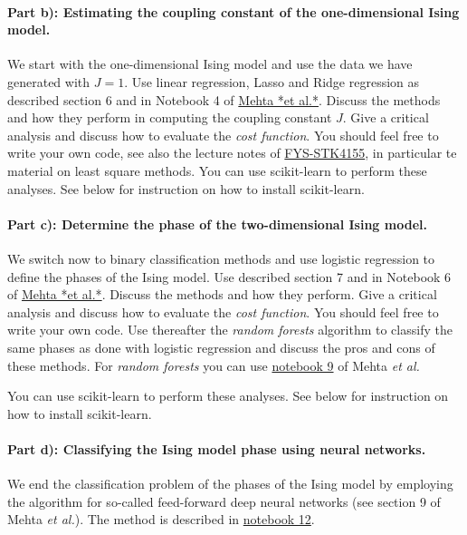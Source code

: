 \documentclass[%
oneside,                 %
final,                   %
10pt]{article}
\begin{document}
\paragraph{Part b): Estimating the coupling constant of the one-dimensional Ising model.}
We start with the one-dimensional Ising model and use the data we have generated with $J=1$. Use linear regression, Lasso and Ridge regression as described section 6 and in Notebook 4 of \href{{https://physics.bu.edu/~pankajm/ML-Notebooks/HTML/NB_CVI-linreg_ising.html}}{Mehta *et al.*}. Discuss the methods and how they perform in computing the coupling constant $J$. Give a critical analysis and discuss how to evaluate the \emph{cost function}. You should feel free to write your own code, see also
the lecture notes of \href{{https://compphysics.github.io/MachineLearning/doc/web/course.html}}{FYS-STK4155}, in particular te material on least square methods.  You can use scikit-learn to perform these analyses. See below for instruction on how to install scikit-learn.

\paragraph{Part c): Determine the phase of the two-dimensional Ising model.}
We switch now to binary classification methods and use logistic regression to define the phases of the Ising model.
Use described section 7 and in Notebook 6 of \href{{https://physics.bu.edu/~pankajm/ML-Notebooks/HTML/NB_CVII-logreg_ising.html}}{Mehta *et al.*}. Discuss the methods and how they perform. Give a critical analysis and discuss how to evaluate the \emph{cost function}. You should feel free to write your own code. Use thereafter the \emph{random forests} algorithm to classify the same phases as done with logistic regression and discuss the pros and cons of these methods. For \emph{random forests} you can use \href{{https://physics.bu.edu/~pankajm/ML-Notebooks/HTML/NB_CVIII-randomforests_ising.html}}{notebook 9} of Mehta \emph{et al.}

You can use scikit-learn to perform these analyses. See below for instruction on how to install scikit-learn.

\paragraph{Part d): Classifying the Ising model phase using neural networks.}
We end the classification problem of the phases of the Ising model by employing the algorithm for so-called feed-forward deep neural networks (see section 9 of Mehta \emph{et al.}). The method is described in \href{{https://physics.bu.edu/~pankajm/ML-Notebooks/HTML/NB_CIX-DNN_ising_TFlow.html}}{notebook 12}. 
\end{document}
